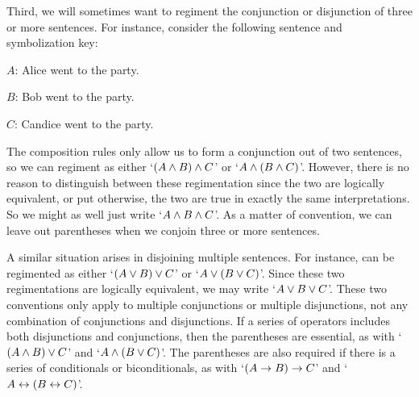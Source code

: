 Third, we will sometimes want to regiment the conjunction or disjunction of three or more sentences.
For instance, consider the following sentence and symbolization key: 

\begin{earg} \label{assoc}
   \label{1}
   \label{2}
\end{earg}

\begin{ekey}
  \item[$A$:] Alice went to the party.
  \item[$B$:] Bob went to the party.
  \item[$C$:] Candice went to the party.
\end{ekey}

The composition rules only allow us to form a conjunction out of two sentences, so we can regiment  as either `$(A \wedge B) \wedge C$' or `$A \wedge (B \wedge C)$'.
However, there is no reason to distinguish between these regimentation since the two are logically equivalent, or put otherwise, the two are true in exactly the same interpretations.
So we might as well just write `$A \wedge B \wedge C$'.
As a matter of convention, we can leave out parentheses when we conjoin three or more sentences.

A similar situation arises in disjoining multiple sentences.
For instance,  can be regimented as either `$(A \vee B) \vee C$' or `$A \vee (B \vee C)$'.
Since these two regimentations are logically equivalent, we may write `$A \vee B \vee C$'.
These two conventions only apply to multiple conjunctions or multiple disjunctions, not any combination of conjunctions and disjunctions.
If a series of operators includes both disjunctions and conjunctions, then the parentheses are essential, as with `$(A \wedge B) \vee C$' and `$A \wedge (B \vee C)$'.
The parentheses are also required if there is a series of conditionals or biconditionals, as with `$(A \rightarrow B) \rightarrow C$' and `$A \leftrightarrow (B \leftrightarrow C)$'.

